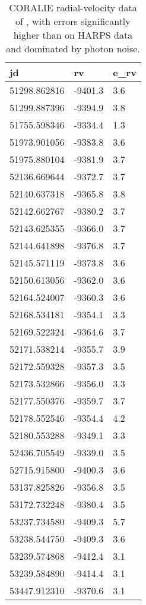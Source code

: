 \begin{table}
\par
\caption{CORALIE radial-velocity data of  , with errors significantly higher than on HARPS data and dominated by photon noise. \label{ta:corrvdata}} 
\begin{tabular}{l l l}
\hline\hline
 {jd} &  {rv} &  {e_rv} \\ 
 \hline
51298.862816	 & -9401.3	 & 3.6\\
51299.887396	 & -9394.9	 & 3.8\\
51755.598346	 & -9334.4	 & 1.3\\
51973.901056	 & -9383.8	 & 3.6\\
51975.880104	 & -9381.9	 & 3.7\\
52136.669644	 & -9372.7	 & 3.7\\
52140.637318	 & -9365.8	 & 3.8\\
52142.662767	 & -9380.2	 & 3.7\\
52143.625355	 & -9366.0	 & 3.7\\
52144.641898	 & -9376.8	 & 3.7\\
52145.571119	 & -9373.8	 & 3.6\\
52150.613056	 & -9362.0	 & 3.6\\
52164.524007	 & -9360.3	 & 3.6\\
52168.534181	 & -9354.1	 & 3.3\\
52169.522324	 & -9364.6	 & 3.7\\
52171.538214	 & -9355.7	 & 3.9\\
52172.559328	 & -9357.3	 & 3.5\\
52173.532866	 & -9356.0	 & 3.3\\
52177.550376	 & -9359.7	 & 3.7\\
52178.552546	 & -9354.4	 & 4.2\\
52180.553288	 & -9349.1	 & 3.3\\
52436.705549	 & -9339.0	 & 3.5\\
52715.915800	 & -9400.3	 & 3.6\\
53137.825826	 & -9356.8	 & 3.5\\
53172.732248	 & -9380.4	 & 3.5\\
53237.734580	 & -9409.3	 & 5.7\\
53238.544750	 & -9409.3	 & 3.6\\
53239.574868	 & -9412.4	 & 3.1\\
53239.584890	 & -9414.4	 & 3.1\\
53447.912310	 & -9370.6	 & 3.1\\

\end{tabular}
\end{table}
